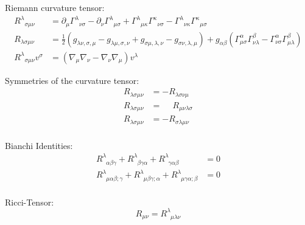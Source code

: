 			\noindent
			Riemann curvature tensor:
			\begin{equation}
				\begin{aligned}
					R^{\lambda}{}_{\sigma\mu\nu} &=
					\partial_{\mu}\Gamma^{\lambda}{}_{\nu\sigma} -
					\partial_{\nu}\Gamma^{\lambda}{}_{\mu\sigma} +
					\Gamma^{\lambda}{}_{\mu\kappa}\Gamma^{\kappa}{}_{\nu\sigma} -
					\Gamma^{\lambda}{}_{\nu\kappa}\Gamma^{\kappa}{}_{\mu\sigma} \\
					R_{\lambda\sigma\mu\nu} &= \frac{1}{2}\left(
					g_{\lambda\nu,\sigma,\mu} - g_{\lambda\mu,\sigma,\nu} + g_{\sigma\mu,\lambda,\nu} -	 g_{\sigma\nu,\lambda,\mu}
					\right)
					+ g_{\alpha\beta} \left(
					\Gamma^{\alpha}_{\mu\sigma} \Gamma^{\beta}_{\nu\lambda} - \Gamma^{\alpha}_{\nu\sigma} \Gamma^{\beta}_{\mu\lambda}
					\right)
					\\
					R^{\lambda}{}_{\sigma\mu\nu}v^\sigma &= \left(\nabla_\mu \nabla_\nu - \nabla_\nu \nabla_\mu \right) v^\lambda
				\end{aligned}
			\end{equation}

			\noindent
			Symmetries of the curvature tensor:
			\begin{equation}
				\begin{aligned}
					R_{\lambda\sigma\mu\nu} &= - R_{\lambda\sigma\nu\mu} \\
					R_{\lambda\sigma\mu\nu} &= \phantom{-} R_{\mu\nu\lambda\sigma} \\
					R_{\lambda\sigma\mu\nu} &= - R_{\sigma\lambda\mu\nu} \\
				\end{aligned}
			\end{equation}

			\noindent
			Bianchi Identities:
			\begin{equation}
				\begin{aligned}
					R^{\lambda}_{\phantom{\lambda}\alpha\beta\gamma} + R^{\lambda}_{\phantom{\lambda}\beta\gamma\alpha} + R^{\lambda}_{\phantom{\lambda}\gamma\alpha\beta} &= 0 \\
					R^{\lambda}_{\phantom{\lambda}\mu\alpha\beta;\gamma} + R^{\lambda}_{\phantom{\lambda}\mu\beta\gamma;\alpha} + R^{\lambda}_{\phantom{\lambda}\mu\gamma\alpha;\beta} &= 0 \\
				\end{aligned}
			\end{equation}

			\noindent
			Ricci-Tensor:
			\begin{equation}
				R_{\mu\nu} = R^\lambda_{\phantom{\lambda}\mu\lambda\nu}
			\end{equation}

